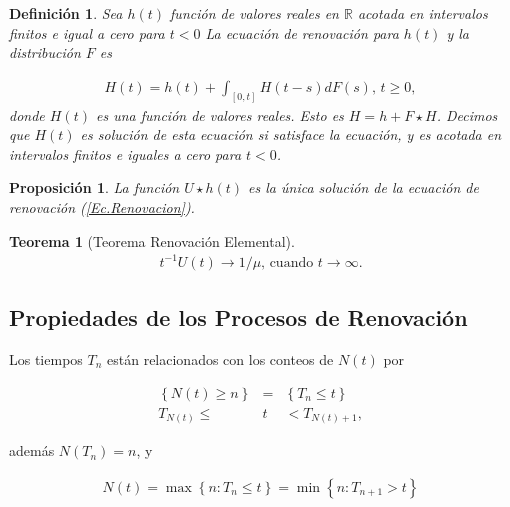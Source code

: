 \documentclass{article}
\newtheorem{Def}{Definición}
\newtheorem{Teo}{Teorema}
\newtheorem{Prop}{Proposición}
\newcommand{\rea}{\mathbb{R}}
\begin{document}
\begin{Def}
Sea $h\left(t\right)$ funci\'on de valores reales en $\rea$ acotada en intervalos finitos e igual a cero para $t<0$ La ecuaci\'on de renovaci\'on para $h\left(t\right)$ y la distribuci\'on $F$ es

\begin{eqnarray}\label{Ec.Renovacion}
H\left(t\right)=h\left(t\right)+\int_{\left[0,t\right]}H\left(t-s\right)dF\left(s\right)\textrm{,    }t\geq0,
\end{eqnarray}
donde $H\left(t\right)$ es una funci\'on de valores reales. Esto es $H=h+F\star H$. Decimos que $H\left(t\right)$ es soluci\'on de esta ecuaci\'on si satisface la ecuaci\'on, y es acotada en intervalos finitos e iguales a cero para $t<0$.
\end{Def}

\begin{Prop}
La funci\'on $U\star h\left(t\right)$ es la \'unica soluci\'on de la ecuaci\'on de renovaci\'on (\ref{Ec.Renovacion}).
\end{Prop}

\begin{Teo}[Teorema Renovaci\'on Elemental]
\begin{eqnarray*}
t^{-1}U\left(t\right)\rightarrow 1/\mu\textrm{,    cuando }t\rightarrow\infty.
\end{eqnarray*}
\end{Teo}

%
\subsection{Propiedades de los Procesos de Renovaci\'on}
%

Los tiempos $T_{n}$ est\'an relacionados con los conteos de $N\left(t\right)$ por

\begin{eqnarray*}
\left\{N\left(t\right)\geq n\right\}&=&\left\{T_{n}\leq t\right\}\\
T_{N\left(t\right)}\leq &t&<T_{N\left(t\right)+1},
\end{eqnarray*}

adem\'as $N\left(T_{n}\right)=n$, y 

\begin{eqnarray*}
N\left(t\right)=\max\left\{n:T_{n}\leq t\right\}=\min\left\{n:T_{n+1}>t\right\}
\end{eqnarray*}
\end{document}
